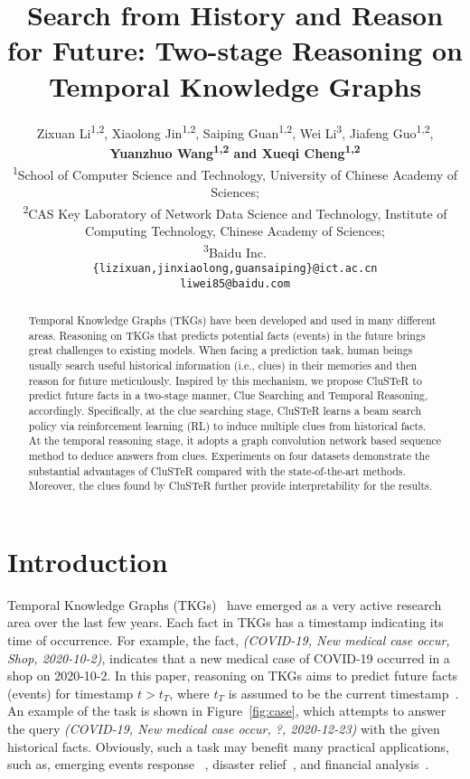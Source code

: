 \documentclass[11pt,a4paper]{article}
\title{Search from History and Reason for Future: Two-stage Reasoning on Temporal Knowledge Graphs}
\author{Zixuan Li\textsuperscript{1,2}, Xiaolong Jin\textsuperscript{1,2}, Saiping Guan\textsuperscript{1,2}, Wei Li\textsuperscript{3}, Jiafeng Guo\textsuperscript{1,2}, \\
 \textbf{Yuanzhuo Wang\textsuperscript{1,2} and Xueqi Cheng\textsuperscript{1,2}} \\
  \textsuperscript{1}School of Computer Science and Technology, University of Chinese Academy of Sciences; \\
  \textsuperscript{2}CAS Key Laboratory of Network Data Science and Technology, Institute of\\ Computing Technology, Chinese Academy of Sciences;\\
  \textsuperscript{3}Baidu Inc. \\
  \texttt{\{lizixuan,jinxiaolong,guansaiping\}@ict.ac.cn}\\
  \texttt{liwei85@baidu.com}
  }
\date{}
\begin{document}
\maketitle
\begin{abstract}
Temporal Knowledge Graphs (TKGs) have been developed and used in many different
areas. Reasoning on TKGs that predicts potential facts (events) in the future
brings great challenges to existing models. When facing a prediction
task, human beings usually search useful historical information (i.e., clues) in
their memories and then reason for future meticulously. Inspired by this
mechanism, we propose CluSTeR to predict future facts in a two-stage manner,
Clue Searching and Temporal Reasoning, accordingly. Specifically, at the clue
searching stage, CluSTeR learns a beam search policy via reinforcement learning (RL)
to induce multiple clues from historical facts. At the temporal reasoning stage,
it adopts a graph convolution network based sequence method to deduce answers
from clues. Experiments on four datasets demonstrate the substantial advantages
of CluSTeR compared with the state-of-the-art methods. Moreover, the clues found
by CluSTeR further provide interpretability for the results. 
\end{abstract}

\section{Introduction}

Temporal Knowledge Graphs
(TKGs)~\cite{boschee2015icews,gottschalk2018eventkg,gottschalk2019eventkg,
zhao2020event} have emerged as a very active research area over the last few
years. Each fact in TKGs has a timestamp indicating its time of occurrence. For
example, the fact, \emph{(COVID-19, New medical case occur, Shop, 2020-10-2)},
indicates that a new medical case of COVID-19 occurred in a shop on 2020-10-2. In
this paper, reasoning on TKGs aims to predict future facts (events) for
timestamp $t>t_{T}$, where $t_T$ is assumed to be the current
timestamp~\cite{jin2020Renet}.
An example of the task is shown in Figure~\ref{fig:case}, which attempts to
answer the query \emph{(COVID-19, New medical case occur, ?, 2020-12-23)} with
the given historical facts. Obviously, such a task may benefit many practical
applications, such as, emerging events response ~\cite{muthiah2015planned,
phillips2017using, korkmaz2015combining}, disaster
relief~\cite{signorini2011use}, and financial analysis~\cite{bollen2011twitter}.
\end{document}
